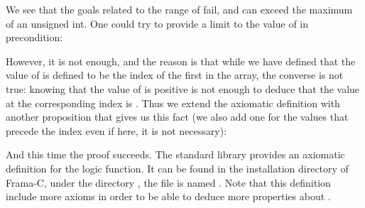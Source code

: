 We see that the goals related to the range of  fail, and
 can exceed the maximum of an unsigned int. One could try
to provide a limit to the value of  in precondition:






However, it is not enough, and the reason is that while we have defined
that the value of  is defined to be the index of
the first  in the array, the converse is
not true: knowing that the value of  is positive
is not enough to deduce that the value at the corresponding index is
. Thus we extend the axiomatic definition
with another proposition that gives us this fact (we also add one for the
values that precede the  index even if here, it is
not necessary):







And this time the proof succeeds. The standard library provides an
axiomatic definition for the  logic function. It can
be found in the installation directory of Frama-C, under the directory
, the file is named .
Note that this definition include more axioms in order to be able to
deduce more properties about .
